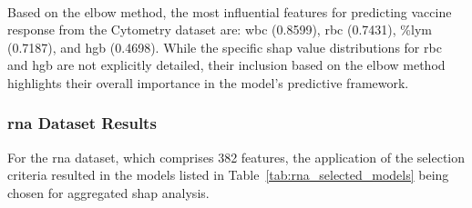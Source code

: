 \documentclass[12pt,a4paper]{report}
\begin{document}
\\
Based on the elbow method, the most influential features for predicting vaccine response from the Cytometry dataset are: \gls{wbc} (0.8599), \acrshort{rbc} (0.7431), \%\acrshort{lym} (0.7187), and \acrshort{hgb} (0.4698). While the specific \gls{shap} value distributions for \acrshort{rbc} and \acrshort{hgb} are not explicitly detailed, their inclusion based on the elbow method highlights their overall importance in the model's predictive framework.


\subsubsection*{\acrshort{rna} Dataset Results}
\noindent
For the \acrshort{rna} dataset, which comprises 382 features, the application of the selection criteria resulted in the models listed in Table~\ref{tab:rna_selected_models} being chosen for aggregated \gls{shap} analysis.
\end{document}

